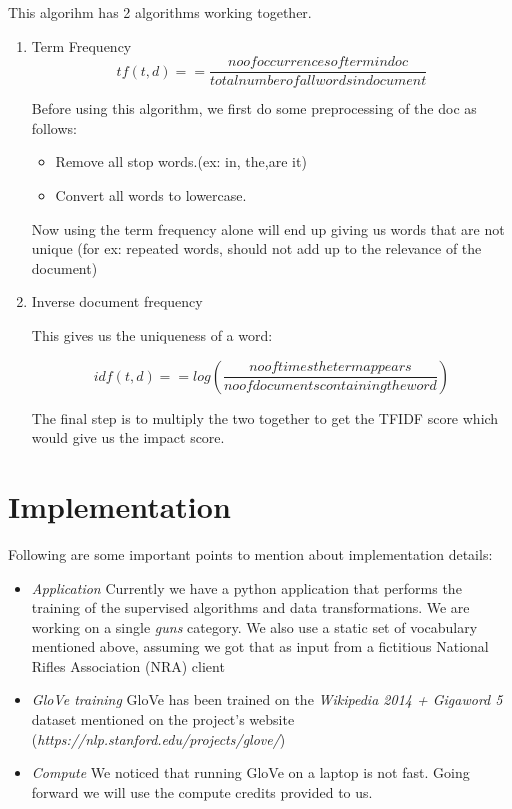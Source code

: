 \documentclass{article}
\begin{document}
This algorihm has 2 algorithms working together.
\begin{enumerate}
\item {Term Frequency}
\[tf(t,d) =  = \frac{no of occurrences of term in doc }{total number of all words in document}\]


Before using this algorithm, we first do some preprocessing of the doc as follows:
\begin{itemize}
\item {Remove all stop words.(ex: in, the,are it)}
\item {Convert all words to lowercase.}
\end {itemize}
Now using the term frequency alone will end up giving us words that are not unique (for ex: repeated words, should not add up to the relevance of the document)

\item Inverse document frequency

 This gives us the uniqueness of a word:

 \[idf(t,d) =  = log(\frac{no of times the term appears }{no of documents containing the word})\]

The final step is to multiply the two together to get the TFIDF score which would give us the impact score.
\end{enumerate}


\maketitle
\section{Implementation} %
Following are some important points to mention about implementation details:
\begin {itemize}
\item \textit{Application} Currently we have a python application that performs the training of the supervised algorithms and data transformations. We are working on a single \textit {guns} category. We also use a static set of vocabulary mentioned above, assuming we got that as input from a fictitious National Rifles Association (NRA) client
\item \textit {GloVe training} GloVe has been trained on the \textit{Wikipedia 2014 + Gigaword 5} dataset mentioned on the project's website (\textit{https://nlp.stanford.edu/projects/glove/})
\item \textit {Compute} We noticed that running GloVe on a laptop is not fast. Going forward we will use the compute credits provided to us.
\end {itemize}
\end{document}
